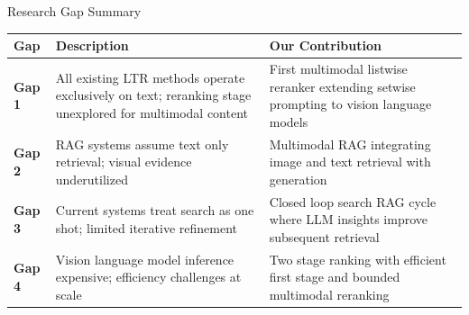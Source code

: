 \documentclass[aspectratio=169,xcolor=dvipsnames]{beamer}
\begin{document}
\begin{frame}{Research Gap Summary}
    \scriptsize
    \begin{table}
        \centering
        \renewcommand{\arraystretch}{1.2}
        \begin{tabular}{p{}|p{}|p{}}
        \toprule
        \textbf{Gap} & \textbf{Description} & \textbf{Our Contribution} \\
        \midrule
        \textbf{Gap 1} & All existing LTR methods operate exclusively on text; reranking stage unexplored for multimodal content & First multimodal listwise reranker extending setwise prompting to vision language models \\
        \midrule
        \textbf{Gap 2} & RAG systems assume text only retrieval; visual evidence underutilized & Multimodal RAG integrating image and text retrieval with generation \\
        \midrule
        \textbf{Gap 3} & Current systems treat search as one shot; limited iterative refinement & Closed loop search RAG cycle where LLM insights improve subsequent retrieval \\
        \midrule
        \textbf{Gap 4} & Vision language model inference expensive; efficiency challenges at scale & Two stage ranking with efficient first stage and bounded multimodal reranking \\
        \bottomrule
        \end{tabular}
    \end{table}
\end{frame}
\end{document}
